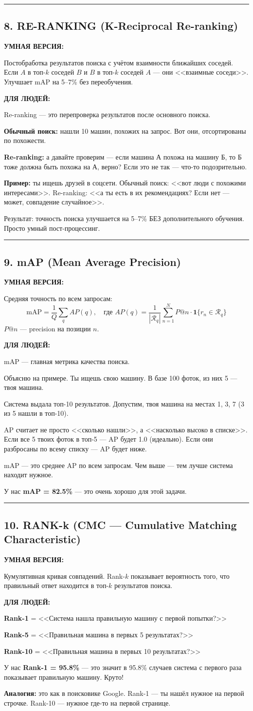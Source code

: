 \documentclass[12pt,a4paper]{article}
\newcommand{\term}[3]{
\noindent\rule{\textwidth}{1pt}
\subsection*{#1}

\textcolor{smartgreen}{\textbf{УМНАЯ ВЕРСИЯ:}}

#2

\vspace{0.5em}
\textcolor{simpleblue}{\textbf{ДЛЯ ЛЮДЕЙ:}}

#3

\vspace{1em}
}
\begin{document}
\term{8. RE-RANKING (K-Reciprocal Re-ranking)}
{Постобработка результатов поиска с учётом взаимности ближайших соседей.
Если $A$ в топ-$k$ соседей $B$ и $B$ в топ-$k$ соседей $A$ — они <<взаимные соседи>>. Улучшает mAP на 5--7\% без переобучения.}
{Re-ranking — это перепроверка результатов после основного поиска.

\textbf{Обычный поиск:} нашли 10 машин, похожих на запрос. Вот они, отсортированы по похожести.

\textbf{Re-ranking:} а давайте проверим — если машина А похожа на машину Б, то Б тоже должна быть похожа на А, верно? Если это не так — что-то подозрительно.

\textbf{Пример:} ты ищешь друзей в соцсети. Обычный поиск: <<вот люди с похожими интересами>>. Re-ranking: <<а ты есть в их рекомендациях? Если нет — может, совпадение случайное>>.

Результат: точность поиска улучшается на 5--7\% БЕЗ дополнительного обучения. Просто умный пост-процессинг.}

\term{9. mAP (Mean Average Precision)}
{Средняя точность по всем запросам:
\[
\text{mAP} = \frac{1}{Q} \sum_{q} AP(q), \quad \text{где } AP(q) = \frac{1}{|\mathcal{R}_q|} \sum_{n=1}^{N} P@n \cdot \mathbf{1}\{r_n \in \mathcal{R}_q\}
\]
$P@n$ — precision на позиции $n$.}
{mAP — главная метрика качества поиска.

Объясню на примере. Ты ищешь свою машину. В базе 100 фоток, из них 5 — твоя машина.

Система выдала топ-10 результатов. Допустим, твоя машина на местах 1, 3, 7 (3 из 5 нашли в топ-10).

AP считает не просто <<сколько нашли>>, а <<насколько высоко в списке>>. Если все 5 твоих фоток в топ-5 — AP будет 1.0 (идеально). Если они разбросаны по всему списку — AP будет ниже.

mAP — это среднее AP по всем запросам. Чем выше — тем лучше система находит нужное.

У нас \textbf{mAP = 82.5\%} — это очень хорошо для этой задачи.}

\term{10. RANK-k (CMC — Cumulative Matching Characteristic)}
{Кумулятивная кривая совпадений. Rank-$k$ показывает вероятность того, что правильный ответ находится в топ-$k$ результатов поиска.}
{\textbf{Rank-1} = <<Система нашла правильную машину с первой попытки?>>

\textbf{Rank-5} = <<Правильная машина в первых 5 результатах?>>

\textbf{Rank-10} = <<Правильная машина в первых 10 результатах?>>

У нас \textbf{Rank-1 = 95.8\%} — это значит в 95.8\% случаев система с первого раза показывает правильную машину. Круто!

\textbf{Аналогия:} это как в поисковике Google. Rank-1 — ты нашёл нужное на первой строчке. Rank-10 — нужное где-то на первой странице.}
\end{document}
